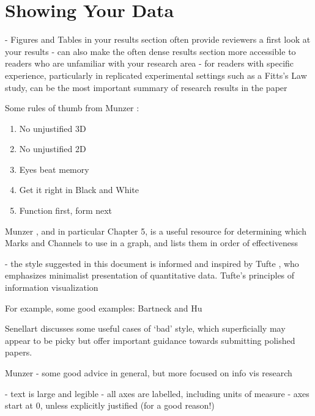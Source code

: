 \section{Showing Your Data}


- Figures and Tables in your results section often provide reviewers a first look at your results
- can also make the often dense results section more accessible to readers who are unfamiliar with your research area
- for readers with specific experience, particularly in replicated experimental settings such as a Fitts's Law study, can be the most important summary of research results in the paper 


Some rules of thumb from Munzer \cite{munzner2014visualization}:
\begin{enumerate}
	\item No unjustified 3D
	\item No unjustified 2D
	\item Eyes beat memory
	\item Get it right in Black and White
	\item Function first, form next
\end{enumerate}


Munzer \cite{munzner2014visualization}, and in particular Chapter 5, is a useful resource for determining which Marks and Channels to use in a graph, and lists them in order of effectiveness

- the style suggested in this document is informed and inspired by Tufte \cite{tufte1983visual}, who emphasizes minimalist presentation of quantitative data. Tufte's principles of information visualization 

 
 
 For example, some good examples:
Bartneck and Hu \cite{Bartneck:2009:SAC:1518701.1518810}


Senellart \cite{Senellart:2013:DYR:2513166.2514938} discusses some useful cases of `bad' style, which superficially may appear to be picky but offer important guidance towards submitting polished papers. 
 
 
Munzer \cite{Munzner:2008:PPW:1422919.1422927} 
- some good advice in general, but more focused on info vis research

- text is large and legible
- all axes are labelled, including units of measure
- axes start at 0, unless explicitly justified (for a good reason!)













